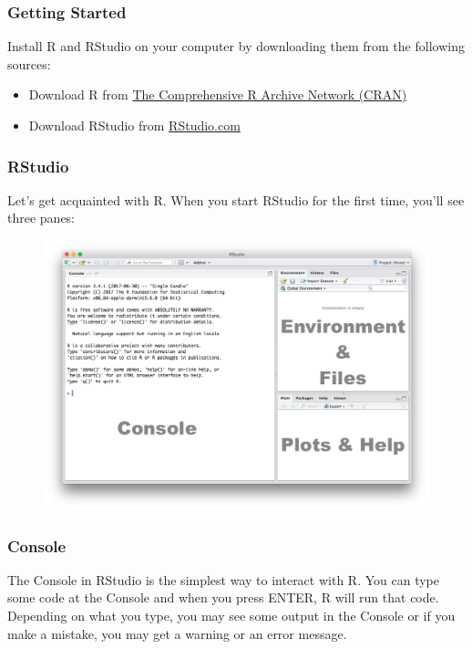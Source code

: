 \documentclass[]{article}
\providecommand{\tightlist}{%
  \setlength{\itemsep}{0pt}\setlength{\parskip}{0pt}}
\theoremstyle{definition}
\theoremstyle{definition}
\theoremstyle{definition}
\theoremstyle{remark}
\begin{document}
\subsubsection{Getting Started}\label{getting-started}

Install R and RStudio on your computer by downloading them from the
following sources:

\begin{itemize}
\tightlist
\item
  Download R from \href{https://cran.r-project.org}{The Comprehensive R
  Archive Network (CRAN)}
\item
  Download RStudio from \href{https://www.rstudio.com}{RStudio.com}
\end{itemize}

\subsubsection{RStudio}\label{rstudio}

Let's get acquainted with R. When you start RStudio for the first time,
you'll see three panes:

\begin{figure}
\centering
\includegraphics{./img/rstudio_default.png}
\caption{}
\end{figure}

\subsubsection{Console}\label{console}

The Console in RStudio is the simplest way to interact with R. You can
type some code at the Console and when you press ENTER, R will run that
code. Depending on what you type, you may see some output in the Console
or if you make a mistake, you may get a warning or an error message.
\end{document}
